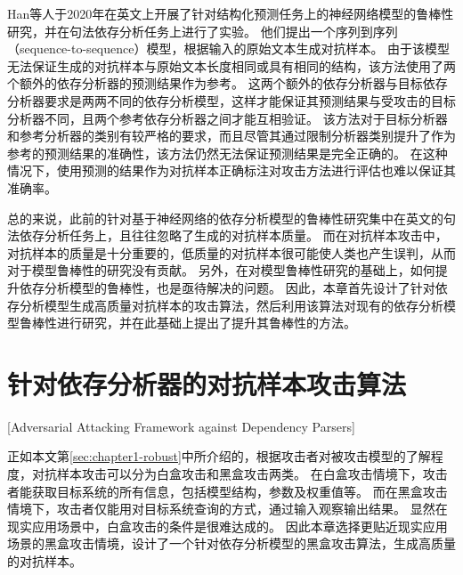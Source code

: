 Han等人\cite{han-etal-2020-adversarial}于2020年在英文上开展了针对结构化预测任务上的神经网络模型的鲁棒性研究，并在句法依存分析任务上进行了实验。
他们提出一个序列到序列（sequence-to-sequence）模型，根据输入的原始文本生成对抗样本。
由于该模型无法保证生成的对抗样本与原始文本长度相同或具有相同的结构，该方法使用了两个额外的依存分析器的预测结果作为参考。
这两个额外的依存分析器与目标依存分析器要求是两两不同的依存分析模型，这样才能保证其预测结果与受攻击的目标分析器不同，且两个参考依存分析器之间才能互相验证。
该方法对于目标分析器和参考分析器的类别有较严格的要求，而且尽管其通过限制分析器类别提升了作为参考的预测结果的准确性，该方法仍然无法保证预测结果是完全正确的。
在这种情况下，使用预测的结果作为对抗样本正确标注对攻击方法进行评估也难以保证其准确率。

总的来说，此前的针对基于神经网络的依存分析模型的鲁棒性研究集中在英文的句法依存分析任务上，且往往忽略了生成的对抗样本质量。
而在对抗样本攻击中，对抗样本的质量是十分重要的，低质量的对抗样本很可能使人类也产生误判，从而对于模型鲁棒性的研究没有贡献。
另外，在对模型鲁棒性研究的基础上，如何提升依存分析模型的鲁棒性，也是亟待解决的问题。
因此，本章首先设计了针对依存分析模型生成高质量对抗样本的攻击算法，然后利用该算法对现有的依存分析模型鲁棒性进行研究，并在此基础上提出了提升其鲁棒性的方法。

\section{针对依存分析器的对抗样本攻击算法}[Adversarial Attacking Framework against Dependency Parsers]

正如本文第\ref{sec:chapter1-robust}中所介绍的，根据攻击者对被攻击模型的了解程度，对抗样本攻击可以分为白盒攻击和黑盒攻击两类。
在白盒攻击情境下，攻击者能获取目标系统的所有信息，包括模型结构，参数及权重值等。
而在黑盒攻击情境下，攻击者仅能用对目标系统查询的方式，通过输入观察输出结果。
显然在现实应用场景中，白盒攻击的条件是很难达成的。
因此本章选择更贴近现实应用场景的黑盒攻击情境，设计了一个针对依存分析模型的黑盒攻击算法，生成高质量的对抗样本。


